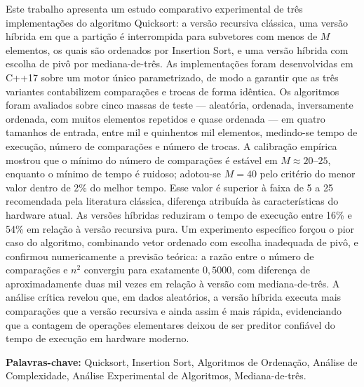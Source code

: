 \begin{resumo}
\vspace{-1cm}
\onehalfspacing

\noindent Este trabalho apresenta um estudo comparativo experimental de três
implementações do algoritmo Quicksort: a versão recursiva clássica, uma versão
híbrida em que a partição é interrompida para subvetores com menos de $M$ elementos,
os quais são ordenados por Insertion Sort, e uma versão híbrida com escolha de pivô
por mediana-de-três. As implementações foram desenvolvidas em C++17 sobre um motor
único parametrizado, de modo a garantir que as três variantes contabilizem
comparações e trocas de forma idêntica. Os algoritmos foram avaliados sobre cinco
massas de teste --- aleatória, ordenada, inversamente ordenada, com muitos elementos
repetidos e quase ordenada --- em quatro tamanhos de entrada, entre mil e quinhentos
mil elementos, medindo-se tempo de execução, número de comparações e número de
trocas. A calibração empírica mostrou que o mínimo do número de comparações é estável
em $M \approx 20$--$25$, enquanto o mínimo de tempo é ruidoso; adotou-se $M = 40$ pelo
critério do menor valor dentro de 2\% do melhor tempo. Esse valor é superior à
faixa de 5 a 25 recomendada pela literatura clássica, diferença atribuída às
características do hardware atual. As versões híbridas reduziram o tempo de execução
entre 16\% e 54\% em relação à versão recursiva pura. Um experimento específico
forçou o pior caso do algoritmo, combinando vetor ordenado com escolha inadequada de
pivô, e confirmou numericamente a previsão teórica: a razão entre o número de
comparações e $n^2$ convergiu para exatamente $0{,}5000$, com diferença de
aproximadamente duas mil vezes em relação à versão com mediana-de-três. A análise
crítica revelou que, em dados aleatórios, a versão híbrida executa mais comparações
que a versão recursiva e ainda assim é mais rápida, evidenciando que a contagem de
operações elementares deixou de ser preditor confiável do tempo de execução em
hardware moderno.

\vspace*{.75cm}

\noindent \textbf{Palavras-chave:} Quicksort, Insertion Sort, Algoritmos de
Ordenação, Análise de Complexidade, Análise Experimental de Algoritmos,
Mediana-de-três.

\end{resumo}
